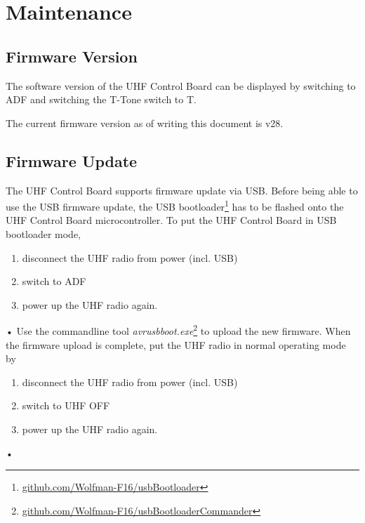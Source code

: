 \documentclass[12pt, a4paper]{report}
\begin{document}

\chapter{Maintenance}
\section{Firmware Version}
The software version of the UHF Control Board can be displayed by switching to ADF and switching the T-Tone switch to T.

The current firmware version as of writing this document is v28.

\section{Firmware Update}
The UHF Control Board supports firmware update via USB. Before being able to use the USB firmware update, the USB bootloader\footnote{\href{}{github.com/Wolfman-F16/usbBootloader}} has to be flashed onto the UHF Control Board microcontroller.
To put the UHF Control Board in USB bootloader mode, 
\begin{enumerate}
\item
disconnect the UHF radio from power (incl. USB)
\item
 switch to ADF
 \item
 power up the UHF radio again.
\end{enumerate}•
Use the commandline tool \emph{avrusbboot.exe}\footnote{\href{}{github.com/Wolfman-F16/usbBootloaderCommander}} to upload the new firmware.
When the firmware upload is complete, put the UHF radio in normal operating mode by
\begin{enumerate}
\item
 disconnect the UHF radio from power (incl. USB)
 \item
switch to UHF OFF
\item
power up the UHF radio again.
\end{enumerate}•

\end{document}
